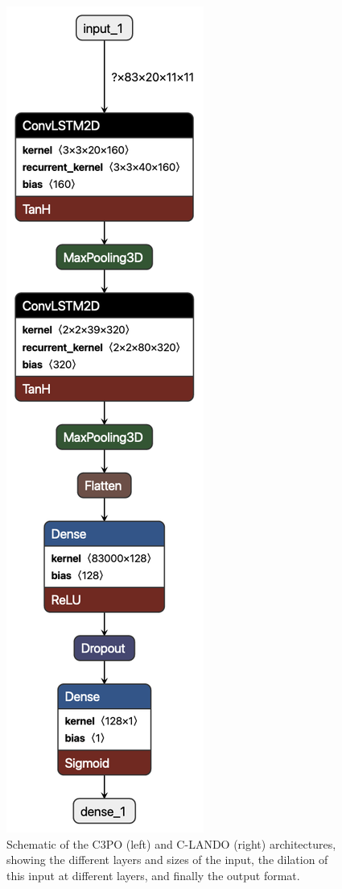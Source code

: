 \documentclass{aa}
\begin{document}
\begin{figure}[!t]
    \includegraphics[height=0.55\textheight]{clando.png}
    \caption{Schematic of the C3PO (left) and C-LANDO (right) architectures, showing the different layers and sizes of the input, the dilation of this input at different layers, and finally the output format.
}
\end{figure}
\end{document}
